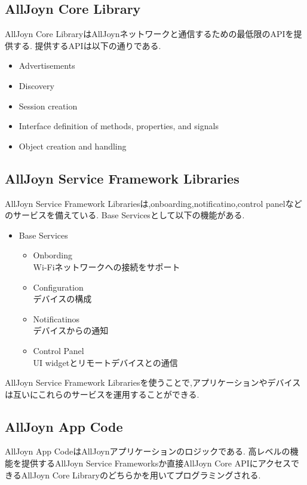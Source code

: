 \subsection{AllJoyn Core Library}
AllJoyn Core LibraryはAllJoynネットワークと通信するための最低限のAPIを提供する.
提供するAPIは以下の通りである.

\begin{itemize}
\item Advertisements
\item Discovery
\item Session creation
\item Interface definition of methods, properties, and signals
\item Object creation and handling
\end{itemize}

\subsection{AllJoyn Service Framework Libraries}
AllJoyn Service Framework Librariesは,onboarding,notificatino,control panelなどのサービスを備えている.
Base Servicesとして以下の機能がある.

\begin{itemize}
\item Base Services
\begin{itemize}
\item Onbording \\ 
Wi-Fiネットワークへの接続をサポート
\item Configuration \\
デバイスの構成
\item Notificatinos \\
デバイスからの通知
\item Control Panel \\
UI widgetとリモートデバイスとの通信
\end{itemize}
\end{itemize}

AllJoyn Service Framework Librariesを使うことで,アプリケーションやデバイスは互いにこれらのサービスを運用することができる.


\subsection{AllJoyn App Code}
AllJoyn App CodeはAllJoynアプリケーションのロジックである.
高レベルの機能を提供するAllJoyn Service Frameworksか直接AllJoyn Core APIにアクセスできるAllJoyn Core Libraryのどちらかを用いてプログラミングされる.

